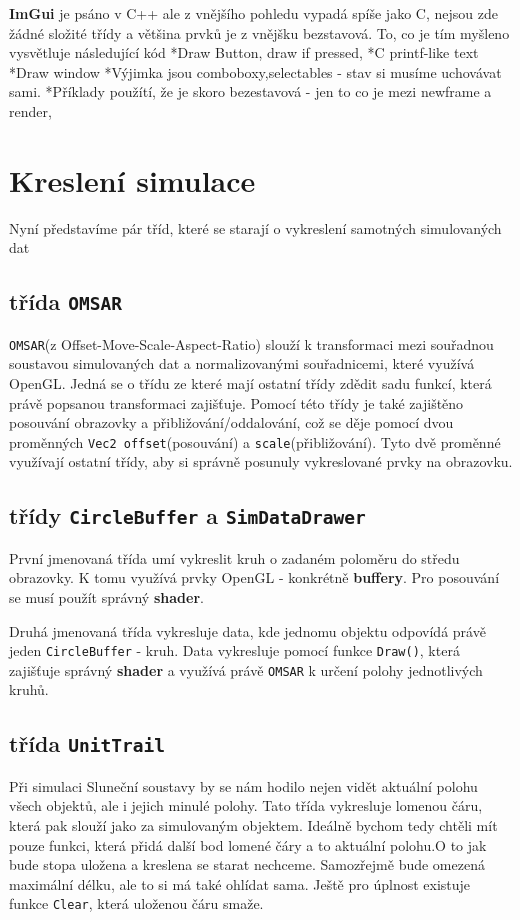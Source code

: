 \textbf{ImGui} je psáno v C++ ale z vnějšího pohledu vypadá spíše jako C, nejsou zde žádné složité třídy a většina prvků je z vnějšku bezstavová. To, co je tím myšleno vysvětluje následující kód
*Draw Button, draw if pressed, 
*C printf-like text
*Draw window
*Výjimka jsou comboboxy,selectables - stav si musíme uchovávat sami.
*Příklady použítí, že je skoro bezestavová - jen to co je mezi newframe a render,

\section{Kreslení simulace}
Nyní představíme pár tříd, které se starají o vykreslení samotných simulovaných dat
\subsection{třída \texttt{OMSAR}}
\texttt{OMSAR}(z Offset-Move-Scale-Aspect-Ratio) slouží k transformaci mezi souřadnou soustavou simulovaných dat a normalizovanými souřadnicemi, které využívá OpenGL. Jedná se o třídu ze které mají ostatní třídy zdědit sadu funkcí, která právě popsanou transformaci zajišťuje. Pomocí této třídy je také zajištěno posouvání obrazovky a přibližování/oddalování, což se děje pomocí dvou proměnných \texttt{Vec2 offset}(posouvání) a \texttt{scale}(přibližování). Tyto dvě proměnné využívají ostatní třídy, aby si správně posunuly vykreslované prvky na obrazovku.
\subsection{třídy \texttt{CircleBuffer} a \texttt{SimDataDrawer}} 
První jmenovaná třída umí vykreslit kruh o zadaném poloměru do středu obrazovky. K tomu využívá prvky OpenGL - konkrétně \textbf{buffery}. Pro posouvání se musí použít správný \textbf{shader}.
 
Druhá jmenovaná třída vykresluje data, kde jednomu objektu odpovídá právě jeden \texttt{CircleBuffer} - kruh. Data vykresluje pomocí funkce \texttt{Draw()}, která zajišťuje správný \textbf{shader} a využívá právě \texttt{OMSAR} k určení polohy jednotlivých kruhů.
\subsection{třída \texttt{UnitTrail}}
Při simulaci Sluneční soustavy by se nám hodilo nejen vidět aktuální polohu všech objektů, ale i jejich minulé polohy. Tato třída vykresluje lomenou čáru, která pak slouží jako  za simulovaným objektem. Ideálně bychom tedy chtěli mít pouze funkci, která přidá další bod lomené čáry a to aktuální polohu.O to jak bude stopa uložena a kreslena se starat nechceme. Samozřejmě bude omezená maximální délku, ale to si má také ohlídat sama. Ještě pro úplnost existuje funkce \texttt{Clear}, která uloženou čáru smaže.

